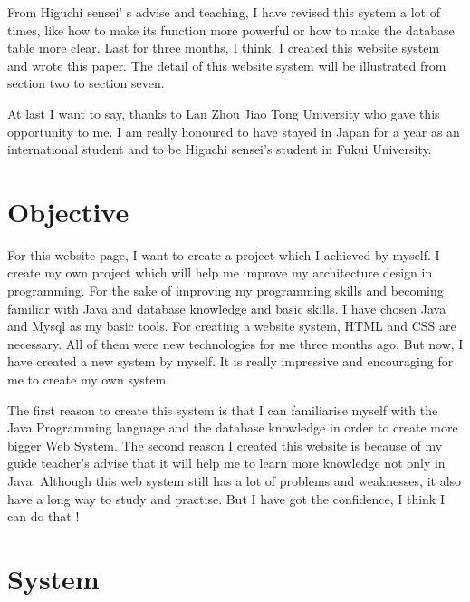 \documentclass[12pt]{article}
\begin{document}
	From Higuchi sensei' s advise and teaching, I have revised this system a lot of times, like how to make its function more powerful or how to make the database table more clear. 
Last for three months, I think, I created this website system and wrote this paper.  The detail of this website system will be illustrated from  section two to section seven.
	
	At last I want to say, thanks to Lan Zhou Jiao Tong University who gave this opportunity to me. I am really honoured to have stayed in Japan for a year as an international student and to be Higuchi sensei's student in Fukui University.

\newpage

\section{Objective}
	For this website page, I want to create a project which I achieved by myself.  I create my own project which will help me improve my architecture design in programming. For the sake of improving my programming skills and becoming familiar with Java and database knowledge and basic skills. I have chosen Java and Mysql as my basic tools. For creating a website system, HTML and CSS are necessary. All of them were new technologies for me three months ago.  But now, I have created a new system by myself. It is really impressive and encouraging for me to create my own system.
	
	The first reason to create this system is that I can familiarise myself with the Java Programming language and the database knowledge in order to create more bigger Web System.
 	The second reason I created this website is because of my guide teacher's advise that it will help me to learn more knowledge not only in Java.
	Although this web system still has a lot of problems and weaknesses, it also have a long way to study and practise. But I have got the confidence, I think I can do that ! 








\cleardoublepage




\section{System}
\end{document}
